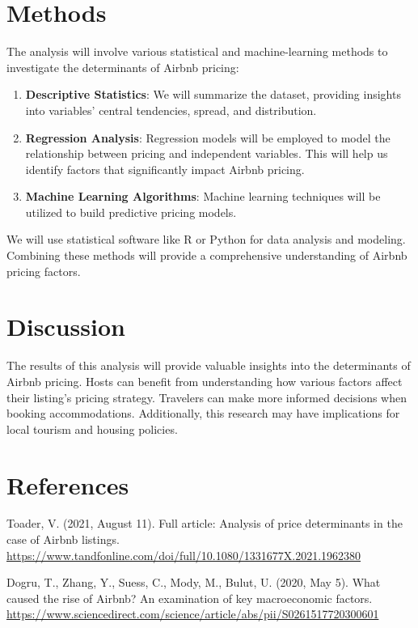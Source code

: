 \documentclass[12pt, letterpaper]{article}
\begin{document}
\section*{Methods}
The analysis will involve various statistical and machine-learning methods to investigate the determinants of Airbnb pricing:
\begin{enumerate}
  \item \textbf{Descriptive Statistics}: We will summarize the dataset, providing insights into variables' central tendencies, spread, and distribution.
  \item \textbf{Regression Analysis}: Regression models will be employed to model the relationship between pricing and independent variables. This will help us identify factors that significantly impact Airbnb pricing.
  \item \textbf{Machine Learning Algorithms}: Machine learning techniques will be utilized to build predictive pricing models.
\end{enumerate}

We will use statistical software like R or Python for data analysis and modeling. Combining these methods will provide a comprehensive understanding of Airbnb pricing factors.

\section*{Discussion}
The results of this analysis will provide valuable insights into the determinants of Airbnb pricing. Hosts can benefit from understanding how various factors affect their listing's pricing strategy. Travelers can make more informed decisions when booking accommodations. Additionally, this research may have implications for local tourism and housing policies.

\section*{References}
\begin{thebibliography}{}

Toader, V. (2021, August 11). Full article: Analysis of price determinants in the case of Airbnb listings.
\url{https://www.tandfonline.com/doi/full/10.1080/1331677X.2021.1962380} 

Dogru, T., Zhang, Y., Suess, C., Mody, M., Bulut, U. (2020, May 5).
What caused the rise of Airbnb? An examination of key macroeconomic factors.
\url{https://www.sciencedirect.com/science/article/abs/pii/S0261517720300601} 

\end{thebibliography}
\end{document}
